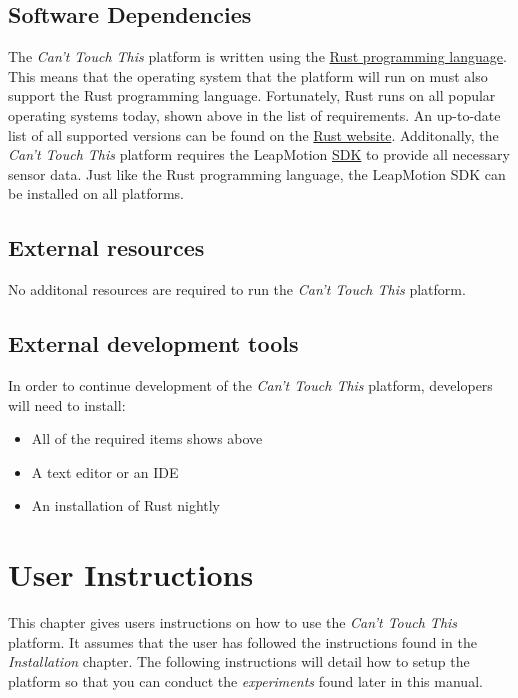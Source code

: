 \documentclass[a4paper]{article}
\providecommand{\tightlist}{%
\setlength{\itemsep}{0pt}\setlength{\parskip}{0pt}}
\begin{document}
  \subsection{Software Dependencies}
  The \textit{Can't Touch This} platform is written using the
  \href{https://rust-lang.org}{Rust programming language}. This means that the
  operating system that the platform will run on must also support the Rust
  programming language. Fortunately, Rust runs on all popular operating systems
  today, shown above in the list of requirements. An up-to-date list of all
  supported versions can be found on the
  \href{https://forge.rust-lang.org/platform-support.html}{Rust website}.
  Additonally, the \textit{Can't Touch This} platform requires the LeapMotion
  \href{https://developer.leapmotion.com/sdk/v2}{SDK} to provide all necessary
  sensor data. Just like the Rust programming language, the LeapMotion SDK can
  be installed on all platforms.

  \subsection{External resources}
  No additonal resources are required to run the \textit{Can't Touch This}
  platform.

  \subsection{External development tools}
  In order to continue development of the \textit{Can't Touch This} platform,
  developers will need to install:
  \begin{itemize}
    \tightlist
    \item All of the required items shows above
    \item A text editor or an IDE
    \item An installation of Rust nightly
  \end{itemize}
  \clearpage

  \section{User Instructions}
  This chapter gives users instructions on how to use the \textit{Can't Touch
    This} platform. It assumes that the user has followed the instructions found
  in the \textit{Installation} chapter. The following instructions will detail
  how to setup the platform so that you can conduct the \textit{experiments}
  found later in this manual.
\end{document}

